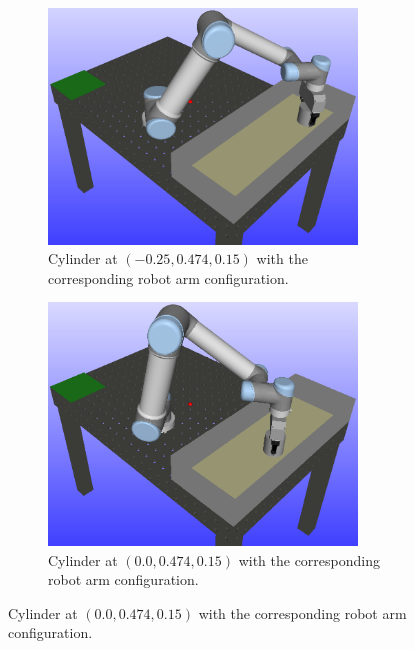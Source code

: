 \documentclass[../main.tex]{subfiles}
\begin{document}
\begin{figure}[H]
    \centering
    \begin{subfigure}[t]{0.24\textwidth}
        \centering
        \captionsetup{width=.9\textwidth}
        \includegraphics[width=0.9\textwidth]{figures/robot_motion_planning/rrt_connect/cylinder1.png}
        \caption{Cylinder at $(-0.25, 0.474, 0.15)$ with the corresponding robot arm configuration.}
        \label{subfig:rrt_cylinder1}
    \end{subfigure}
    \begin{subfigure}[t]{0.24\textwidth}
        \centering
        \captionsetup{width=.9\textwidth}
        \includegraphics[width=0.9\textwidth]{figures/robot_motion_planning/rrt_connect/cylinder2.png}
        \caption{Cylinder at $(0.0, 0.474, 0.15)$ with the corresponding robot arm configuration.}

\end{subfigure}
\end{figure}
\end{document}
